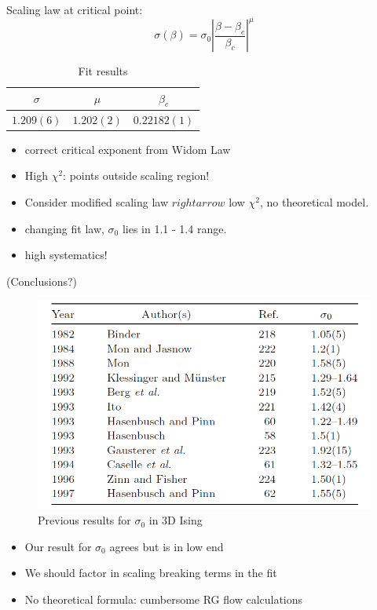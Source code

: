 \documentclass[12pt,handout]{beamer}
\begin{document}
\begin{frame}
\begin{center}
Scaling law at critical point:
\[
\sigma\left(\beta \right) = \sigma_0\left|\frac{\beta - \beta_c}{\beta_c} \right|^{\mu}
\]

\begin{table}[!htb]
\centering
\begin{tabular}{|c|c|c|}
\hline
$\sigma$ & $\mu$ & $\beta_c$\\
\hline
$1.209(6)$ & $1.202(2)$ & $0.22182(1)$\\
\hline
\end{tabular}
\caption{Fit results\label{tab:fitfinal}}
\end{table}

\begin{itemize}
\item correct critical exponent from Widom Law
\item High $\chi ^2$: points outside scaling region!
\item Consider modified scaling law $rightarrow$ low $\chi ^2$, no theoretical model.
\item changing fit law, $\sigma_0$ lies in 1.1 - 1.4 range.
\item high systematics!
\end{itemize}
\end{center}
\end{frame}

\begin{frame}{(Conclusions?)}
\begin{center}
\begin{figure}
\centering
\includegraphics[scale=0.4]{tableauthors.png}
\caption{Previous results for $\sigma_0$ in 3D Ising\label{fig:authors}}
\end{figure}
\begin{itemize}
\item Our result for $\sigma_0$ agrees but is in low end
\item We should factor in scaling breaking terms in the fit
\item No theoretical formula: cumbersome RG flow calculations
\end{itemize}
\end{center}
\end{frame}

\end{document}
